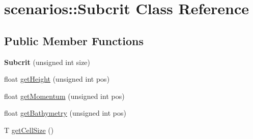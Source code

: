 \hypertarget{classscenarios_1_1Subcrit}{\section{scenarios\-:\-:Subcrit Class Reference}
\label{classscenarios_1_1Subcrit}
}
\subsection*{Public Member Functions}
\begin{DoxyCompactItemize}
\item 
\hypertarget{classscenarios_1_1Subcrit_a799bd84e617307d9b3aed53deaf65264}{{\bfseries Subcrit} (unsigned int size)}\label{classscenarios_1_1Subcrit_a799bd84e617307d9b3aed53deaf65264}

\item 
float \hyperlink{classscenarios_1_1Subcrit_a063ea567e838b2fbfbb847aca618d77d}{get\-Height} (unsigned int pos)
\item 
float \hyperlink{classscenarios_1_1Subcrit_abf0e21e4318b9892ef6551bcd0512fbb}{get\-Momentum} (unsigned int pos)
\item 
float \hyperlink{classscenarios_1_1Subcrit_a9dabea2d1d37c59826171053a0800aa3}{get\-Bathymetry} (unsigned int pos)
\item 
T \hyperlink{classscenarios_1_1Subcrit_a762f6d6ce94e8bd0debf66c5fb25ff19}{get\-Cell\-Size} ()
\end{DoxyCompactItemize}


